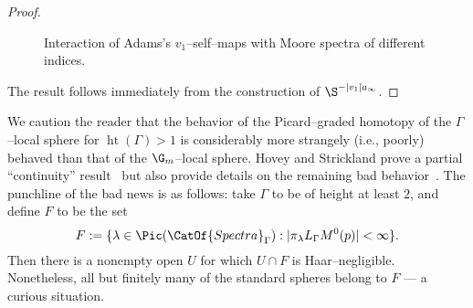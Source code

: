 \begin{proof}
\begin{sidewaysfigure}[ht]
\begin{center}
\end{center}
\caption{Interaction of Adams's $v_1$--self--maps with Moore spectra of different indices.}
\label{SelfMapFigure}
\end{sidewaysfigure}
The result follows immediately from the construction of $\S^{-|v_1| a_\infty}$.
\end{proof}

\begin{remark}
We caution the reader that the behavior of the Picard--graded homotopy of the $\Gamma$--local sphere for $\operatorname{ht}(\Gamma) > 1$ is considerably more strangely (i.e., poorly) behaved than that of the $\G_m$--local sphere.  Hovey and Strickland prove a partial ``continuity'' result~\cite[Proposition 14.6]{HoveyStrickland} but also provide details on the remaining bad behavior~\cite[Theorem 15.1]{HoveyStrickland}.  The punchline of the bad news is as follows: take $\Gamma$ to be of height at least $2$, and define $F$ to be the set \[F := \{\lambda \in \Pic(\CatOf{Spectra}_\Gamma) : |\pi_\lambda L_{\Gamma} M^0(p)| < \infty\}.\] Then there is a nonempty open $U$ for which $U \cap F$ is Haar--negligible.  Nonetheless, all but finitely many of the standard spheres belong to $F$ --- a curious situation.
\end{remark}

